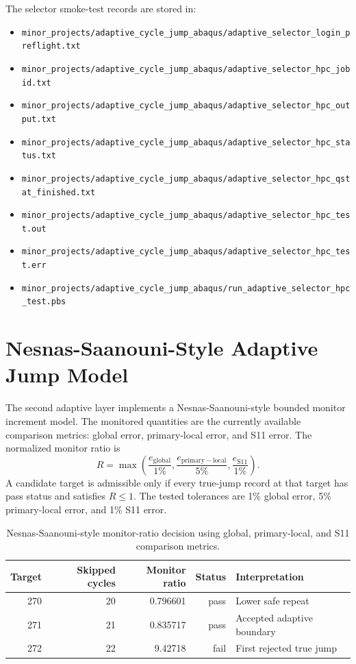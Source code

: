 \documentclass[11pt,a4paper]{article}
\newcommand{\code}[1]{\texttt{#1}}
\begin{document}
The selector smoke-test records are stored in:
\begin{itemize}
  \item \code{minor\_projects/adaptive\_cycle\_jump\_abaqus/adaptive\_selector\_login\_preflight.txt}
  \item \code{minor\_projects/adaptive\_cycle\_jump\_abaqus/adaptive\_selector\_hpc\_jobid.txt}
  \item \code{minor\_projects/adaptive\_cycle\_jump\_abaqus/adaptive\_selector\_hpc\_output.txt}
  \item \code{minor\_projects/adaptive\_cycle\_jump\_abaqus/adaptive\_selector\_hpc\_status.txt}
  \item \code{minor\_projects/adaptive\_cycle\_jump\_abaqus/adaptive\_selector\_hpc\_qstat\_finished.txt}
  \item \code{minor\_projects/adaptive\_cycle\_jump\_abaqus/adaptive\_selector\_hpc\_test.out}
  \item \code{minor\_projects/adaptive\_cycle\_jump\_abaqus/adaptive\_selector\_hpc\_test.err}
  \item \code{minor\_projects/adaptive\_cycle\_jump\_abaqus/run\_adaptive\_selector\_hpc\_test.pbs}
\end{itemize}

\section{Nesnas-Saanouni-Style Adaptive Jump Model}

The second adaptive layer implements a Nesnas-Saanouni-style bounded monitor increment model. The monitored quantities are the currently available comparison metrics: global error, primary-local error, and S11 error. The normalized monitor ratio is
\[
R = \max\left(\frac{e_\mathrm{global}}{1\%}, \frac{e_\mathrm{primary-local}}{5\%}, \frac{e_\mathrm{S11}}{1\%}\right).
\]
A candidate target is admissible only if every true-jump record at that target has pass status and satisfies \(R \leq 1\). The tested tolerances are 1\% global error, 5\% primary-local error, and 1\% S11 error.

\begin{table}[H]
\centering
\small
\begin{tabular}{rrrrl}
\toprule
Target & Skipped cycles & Monitor ratio & Status & Interpretation \\
\midrule
270 & 20 & 0.796601 & pass & Lower safe repeat \\
271 & 21 & 0.835717 & pass & Accepted adaptive boundary \\
272 & 22 & 9.42718 & fail & First rejected true jump \\
\bottomrule
\end{tabular}
\caption{Nesnas-Saanouni-style monitor-ratio decision using global, primary-local, and S11 comparison metrics.}
\end{table}
\end{document}
